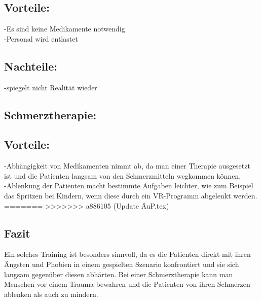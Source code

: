 \subsection{Vorteile:}
-Es sind keine Medikamente notwendig\\
-Personal wird entlastet\\
\subsection{Nachteile:}
-spiegelt nicht Realität wieder\\

\subsection{Schmerztherapie:}
\subsection{Vorteile:}
-Abhängigkeit von Medikamenten nimmt ab, da man einer Therapie ausgesetzt ist und die Patienten langsam von den Schmerzmitteln wegkommen können.\\
-Ablenkung der Patienten macht bestimmte Aufgaben leichter, wie zum Beispiel das Spritzen bei Kindern, wenn diese durch ein VR-Programm abgelenkt werden.\\
=======
>>>>>>> a886105 (Update ÄuP.tex)

\subsection{Fazit}
Ein solches Training ist besonders sinnvoll, da es die Patienten direkt mit ihren Ängsten und Phobien in einem gespielten Szenario konfrontiert und sie sich langsam gegenüber diesen abhärten. Bei einer Schmerztherapie kann man Menschen vor einem Trauma bewahren und die Patienten von ihren Schmerzen ablenken als auch zu mindern.





